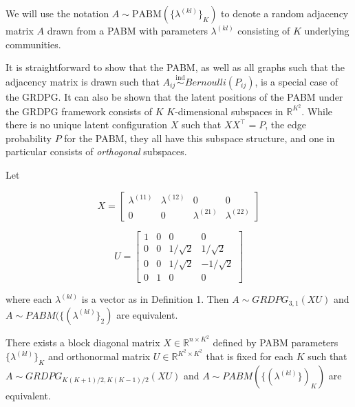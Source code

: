 \documentclass[
  11pt,
]{article}
\begin{document}
We will use the notation \(A \sim \text{PABM}(\{\lambda^{(kl)}\}_K)\) to
denote a random adjacency matrix \(A\) drawn from a PABM with parameters
\(\lambda^{(kl)}\) consisting of \(K\) underlying communities.

It is straightforward to show that the PABM, as well as all graphs such
that the adjacency matrix is drawn such that
\(A_{ij} \stackrel{\text{ind}}{\sim}Bernoulli(P_{ij})\), is a special
case of the GRDPG. It can also be shown that the latent positions of the
PABM under the GRDPG framework consists of \(K\) \(K\)-dimensional
subspaces in \(\mathbb{R}^{K^2}\). While there is no unique latent
configuration \(X\) such that \(X X^\top = P\), the edge probability
\(P\) for the PABM, they all have this subspace structure, and one in
particular consists of \emph{orthogonal} subspaces.

\begin{theorem}[Connecting the PABM to the GRDPG for $K = 2$]
\label{theorem1}  
Let 

$$X = \begin{bmatrix} 
\lambda^{(11)} & \lambda^{(12)} & 0 & 0 \\ 
0 & 0 & \lambda^{(21)} & \lambda^{(22)} 
\end{bmatrix}$$

$$U = \begin{bmatrix} 1 & 0 & 0 & 0 \\
0 & 0 & 1 / \sqrt{2} & 1 / \sqrt{2} \\
0 & 0 & 1 / \sqrt{2} & - 1 / \sqrt{2} \\
0 & 1 & 0 & 0 \end{bmatrix}$$

where each $\lambda^{(kl)}$ is a vector as in Definition 1. 
Then $A \sim GRDPG_{3, 1}(X U)$ and $A \sim PABM(\{(\lambda^{(kl)}\}_2)$ are 
equivalent.
\end{theorem}

\begin{theorem}[Generalization to $K > 2$] 
\label{theorem2}
There exists a block diagonal matrix 
$X \in \mathbb{R}^{n \times K^2}$ defined by PABM parameters 
$\{\lambda^{(kl)}\}_K$ and orthonormal matrix 
$U \in \mathbb{R}^{K^2 \times K^2}$ that is fixed 
for each $K$ such that $A \sim GRDPG_{K (K+1) / 2, K (K-1) / 2}(XU)$ and 
$A \sim PABM(\{(\lambda^{(kl)}\})_K)$ are equivalent.
\end{theorem}
\end{document}
